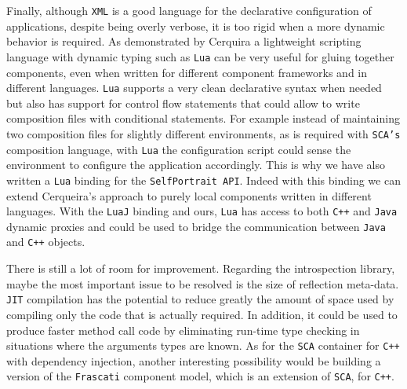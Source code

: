 Finally, although \texttt{XML} is a good language for the declarative configuration of applications, despite being overly verbose, it
is too rigid when a more dynamic behavior is required. As demonstrated by Cerquira \cite{Cerqueira00} a lightweight scripting language with
dynamic typing such as \texttt{Lua} \cite{Lua} can be very useful for gluing together components, even when written for different component
frameworks and in different languages. \texttt{Lua} supports a very clean declarative syntax when needed but also has support for control
flow statements that could allow to write composition files with conditional statements. For example instead of maintaining two
composition files for slightly different environments, as is required with \texttt{SCA's} composition language, with \texttt{Lua} the configuration
script could sense the environment to configure the application accordingly. This is why we have also written a \texttt{Lua} binding
for the \texttt{SelfPortrait API}. Indeed with this binding we can extend Cerqueira's approach to purely local components written
in different languages. With the \texttt{LuaJ} binding and ours, \texttt{Lua} has access to both \texttt{C++} and \texttt{Java} dynamic proxies and could
be used to bridge the communication between \texttt{Java} and \texttt{C++} objects.

There is still a lot of room for improvement. Regarding the introspection library, maybe the most important issue to be resolved is the size of
reflection meta-data. \texttt{JIT} compilation has the potential to reduce greatly the amount of space used by compiling only the code that is
actually required. In addition, it could be used to produce faster method call code by eliminating run-time type checking
in situations where the arguments types are known. As for the \texttt{SCA} container for \texttt{C++} with dependency injection,
another interesting possibility would be building a version of the \texttt{Frascati} \cite{Seinturier} component model, which is an extension of
\texttt{SCA}, for \texttt{C++}.